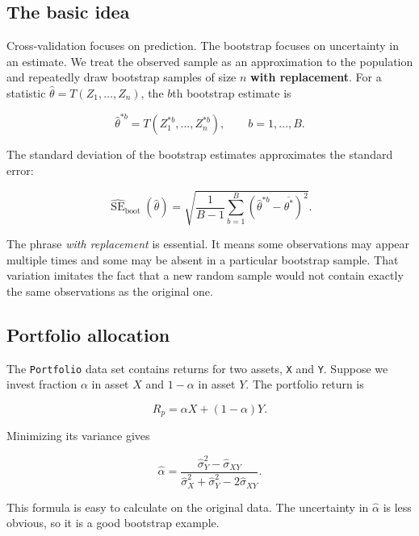 \documentclass[
  11pt,
]{article}
\begin{document}
\subsection{The basic idea}\label{the-basic-idea}

Cross-validation focuses on prediction. The bootstrap focuses on
uncertainty in an estimate. We treat the observed sample as an
approximation to the population and repeatedly draw bootstrap samples of
size \(n\) \textbf{with replacement}. For a statistic
\(\hat{\theta}=T(Z_1,\ldots,Z_n)\), the \(b\)th bootstrap estimate is

\[
\hat{\theta}^{*b} = T(Z_1^{*b},\ldots,Z_n^{*b}),
\qquad b=1,\ldots,B.
\]

The standard deviation of the bootstrap estimates approximates the
standard error:

\[
\widehat{\operatorname{SE}}_{\mathrm{boot}}(\hat{\theta})
= \sqrt{\frac{1}{B-1}\sum_{b=1}^{B}
\left(\hat{\theta}^{*b}-\overline{\theta^*}\right)^2}.
\]

The phrase \emph{with replacement} is essential. It means some
observations may appear multiple times and some may be absent in a
particular bootstrap sample. That variation imitates the fact that a new
random sample would not contain exactly the same observations as the
original one.

\subsection{Portfolio allocation}\label{portfolio-allocation}

The \texttt{Portfolio} data set contains returns for two assets,
\texttt{X} and \texttt{Y}. Suppose we invest fraction \(\alpha\) in
asset \(X\) and \(1-\alpha\) in asset \(Y\). The portfolio return is

\[R_p = \alpha X + (1-\alpha)Y.\]

Minimizing its variance gives

\[
\hat{\alpha} =
\frac{\hat{\sigma}_Y^2-\hat{\sigma}_{XY}}
{\hat{\sigma}_X^2+\hat{\sigma}_Y^2-2\hat{\sigma}_{XY}}.
\]

This formula is easy to calculate on the original data. The uncertainty
in \(\hat{\alpha}\) is less obvious, so it is a good bootstrap example.
\end{document}
